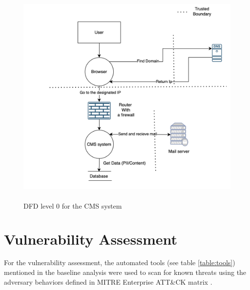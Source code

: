 \begin{figure}[h!]
\centering
\includegraphics[width=\textwidth, height=420px]{pics/dfd.png}
\caption{DFD level 0 for the CMS system}\label{fig:dfd}
\end{figure}


\section{Vulnerability Assessment}
For the vulnerability assessment, the automated tools (see table \ref{table:tools}) mentioned in the baseline analysis were used to scan for known threats using the adversary behaviors defined in MITRE Enterprise ATT\&CK matrix \citep[p.~158]{xiong2022cyber}.

